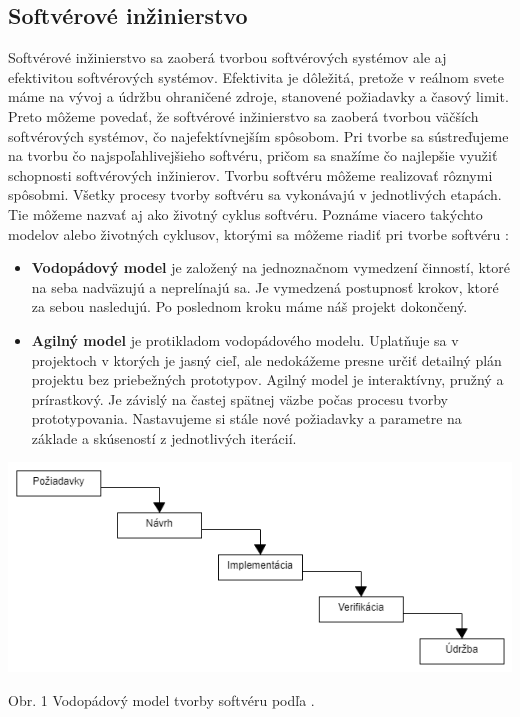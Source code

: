 \documentclass[10pt,twoside,slovak,a4paper]{article}
\begin{document}
\subsection{Softvérové inžinierstvo} \label{SWE}
 Softvérové inžinierstvo \cite{swemb} sa zaoberá tvorbou softvérových systémov ale aj efektivitou softvérových systémov. Efektivita je dôležitá, pretože v reálnom svete máme na vývoj a údržbu ohraničené zdroje, stanovené požiadavky a časový limit. Preto môžeme povedať, že softvérové inžinierstvo sa zaoberá tvorbou väčších softvérových systémov, čo najefektívnejším spôsobom. Pri tvorbe sa sústreďujeme na tvorbu čo najspoľahlivejšieho softvéru, pričom sa snažíme čo najlepšie využiť schopnosti softvérových inžinierov.
Tvorbu softvéru môžeme realizovať rôznymi spôsobmi. Všetky procesy tvorby softvéru sa vykonávajú v jednotlivých etapách. Tie môžeme nazvať aj ako životný cyklus softvéru. Poznáme viacero takýchto modelov alebo životných cyklusov, ktorými sa môžeme riadiť pri tvorbe softvéru \cite{swebp}:
\begin{itemize}
    \item \textbf{Vodopádový model} je založený na jednoznačnom vymedzení činností, ktoré na seba nadväzujú a neprelínajú sa. Je vymedzená postupnosť krokov, ktoré  za sebou nasledujú. Po poslednom kroku máme náš projekt dokončený.
    \item \textbf{Agilný model} je protikladom vodopádového modelu. Uplatňuje sa v projektoch v ktorých je jasný cieľ, ale nedokážeme presne určiť detailný plán projektu bez priebežných prototypov. Agilný model je interaktívny, pružný a prírastkový. Je závislý na častej spätnej väzbe počas procesu tvorby  prototypovania. Nastavujeme si stále nové požiadavky a parametre na základe a skúseností z jednotlivých iterácií. 
\end{itemize}
\begin{center}
\includegraphics[scale=0.4]{vodopad1}
\end{center}
\begin{center}
Obr. 1 Vodopádový model tvorby softvéru podľa \cite{swebp}.
\end{center}
\end{document}
